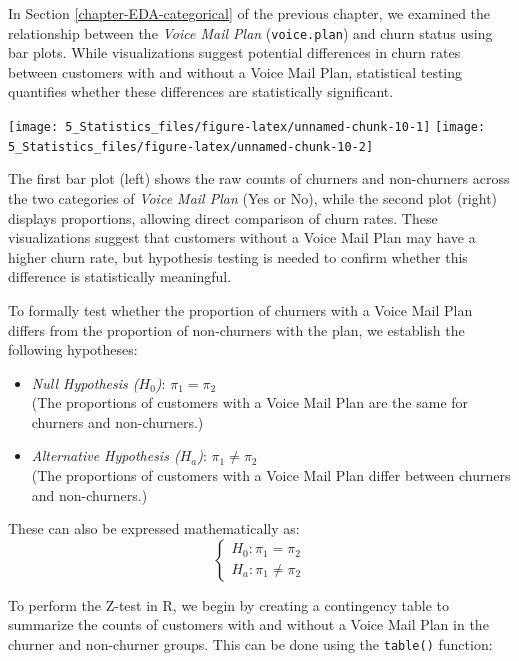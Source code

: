 \documentclass[
  11pt,
]{book}
\makeatletter
\newenvironment{Shaded}{}{}
\newcommand{\AttributeTok}[1]{#1}
\newcommand{\DecValTok}[1]{#1}
\newcommand{\FunctionTok}[1]{#1}
\newcommand{\NormalTok}[1]{#1}
\newcommand{\OtherTok}[1]{\textcolor[rgb]{0.39,0.39,0.39}{#1}}
\newcommand{\SpecialCharTok}[1]{\textcolor[rgb]{0.39,0.39,0.39}{#1}}
\newcommand{\StringTok}[1]{\textcolor[rgb]{0.39,0.39,0.39}{#1}}
\newenvironment{kframe}{%
\medskip{}
\setlength{\fboxsep}{.8em}
 \def\at@end@of@kframe{}%
 \ifinner\ifhmode%
  \def\at@end@of@kframe{\end{minipage}}%
  \begin{minipage}{\columnwidth}%
 \fi\fi%
 \def\FrameCommand##1{\hskip\@totalleftmargin \hskip-\fboxsep
 \colorbox{shadecolor}{##1}\hskip-\fboxsep
     \hskip-\linewidth \hskip-\@totalleftmargin \hskip\columnwidth}%
 \MakeFramed {\advance\hsize-\width
   \@totalleftmargin\z@ \linewidth\hsize
   \@setminipage}}%
 {\par\unskip\endMakeFramed%
 \at@end@of@kframe}
\renewenvironment{Shaded}{\begin{kframe}}{\end{kframe}}
\theoremstyle{definition}
\theoremstyle{definition}
\theoremstyle{definition}
\theoremstyle{definition}
\theoremstyle{remark}
\makeatother
\begin{document}
In Section \ref{chapter-EDA-categorical} of the previous chapter, we examined the relationship between the \emph{Voice Mail Plan} (\texttt{voice.plan}) and churn status using bar plots. While visualizations suggest potential differences in churn rates between customers with and without a Voice Mail Plan, statistical testing quantifies whether these differences are statistically significant.

\texttt{[image: 5\_Statistics\_files/figure-latex/unnamed-chunk-10-1]} \texttt{[image: 5\_Statistics\_files/figure-latex/unnamed-chunk-10-2]}

The first bar plot (left) shows the raw counts of churners and non-churners across the two categories of \emph{Voice Mail Plan} (Yes or No), while the second plot (right) displays proportions, allowing direct comparison of churn rates. These visualizations suggest that customers without a Voice Mail Plan may have a higher churn rate, but hypothesis testing is needed to confirm whether this difference is statistically meaningful.

To formally test whether the proportion of churners with a Voice Mail Plan differs from the proportion of non-churners with the plan, we establish the following hypotheses:

\begin{itemize}
\item
  \emph{Null Hypothesis (\(H_0\))}: \(\pi_1 = \pi_2\)\\
  (The proportions of customers with a Voice Mail Plan are the same for churners and non-churners.)
\item
  \emph{Alternative Hypothesis (\(H_a\))}: \(\pi_1 \neq \pi_2\)\\
  (The proportions of customers with a Voice Mail Plan differ between churners and non-churners.)
\end{itemize}

These can also be expressed mathematically as:
\[
\begin{cases}
    H_0: \pi_1 = \pi_2   \\
    H_a: \pi_1 \neq \pi_2 
\end{cases}
\]

To perform the Z-test in R, we begin by creating a contingency table to summarize the counts of customers with and without a Voice Mail Plan in the churner and non-churner groups. This can be done using the \texttt{table()} function:

\begin{Shaded}
\end{Shaded}
\end{document}
